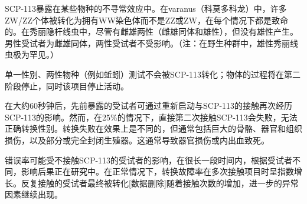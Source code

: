 SCP-113暴露在某些物种的不寻常效应中。在varanus（科莫多科龙）中，许多ZW\slash ZZ个体被转化为拥有WW染色体而不是ZZ或ZW，在每个情况下都是致命的。在秀丽隐杆线虫中，尽管有雌雄两性（雌雄同体和雄性），但没有雄性产生。男性受试者为雌雄同体，两性受试者不受影响。（注：在野生种群中，雄性秀丽线虫极为罕见。）

单一性别、两性物种（例如蚯蚓）测试不会被SCP-113转化；物体的过程将在第二阶段停止，同时该项目停止活动。

在大约60秒钟后，先前暴露的受试者可通过重新启动与SCP-113的接触再次经历SCP-113的影响。然而，在25\%的情况下，直接第二次接触SCP-113会失败，无法正确转换性别。转换失败在效果上是不同的，但通常包括巨大的骨骼、器官和组织损伤，以及部分或完全封闭生殖器。这通常导致器官损伤或内出血致死。

错误率可能受不接触SCP-113的受试者的影响，在很长一段时间内，根据受试者不同，影响后果正在研究中。在正常情况下，转换故障率在多次接触项目时呈指数增长。反复接触的受试者最终被转化{[}数据删除]随着接触次数的增加，进一步的异常因素继续出现。
